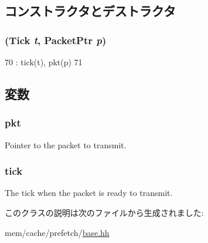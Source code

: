 \subsection{コンストラクタとデストラクタ}
\hypertarget{classBasePrefetcher_1_1DeferredPacket_ab130ef186edfc2a1928d00d723a11fc0}{
\subsubsection[{DeferredPacket}]{ ({\bf Tick} {\em t}, \/  {\bf PacketPtr} {\em p})}}
\label{classBasePrefetcher_1_1DeferredPacket_ab130ef186edfc2a1928d00d723a11fc0}



\begin{DoxyCode}
70             : tick(t), pkt(p)
71         {}
\end{DoxyCode}


\subsection{変数}
\hypertarget{classBasePrefetcher_1_1DeferredPacket_a3a891bc2a0fcbe6be5297077d94e2df7}{
\subsubsection[{pkt}]{ {\bf pkt}}}
\label{classBasePrefetcher_1_1DeferredPacket_a3a891bc2a0fcbe6be5297077d94e2df7}


Pointer to the packet to transmit. \hypertarget{classBasePrefetcher_1_1DeferredPacket_a4daae57fbf09ee5423d123f5ce330e92}{
\subsubsection[{tick}]{ {\bf tick}}}
\label{classBasePrefetcher_1_1DeferredPacket_a4daae57fbf09ee5423d123f5ce330e92}


The tick when the packet is ready to transmit. 

このクラスの説明は次のファイルから生成されました:\begin{DoxyCompactItemize}
\item 
mem/cache/prefetch/\hyperlink{mem_2cache_2prefetch_2base_8hh}{base.hh}\end{DoxyCompactItemize}
